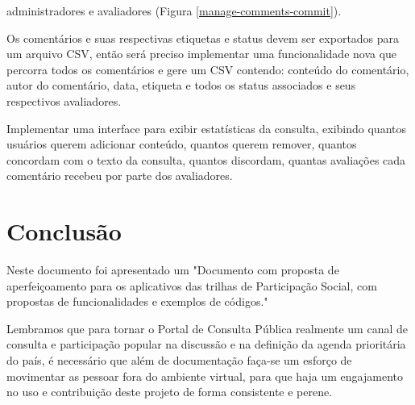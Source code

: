 \documentclass[12pt]{article}
\newcommand{\ProductDescription}{"Documento com proposta de aperfeiçoamento
  para os aplicativos das trilhas de Participação Social, com propostas de
  funcionalidades e exemplos de códigos."
}
\begin{document}
\begin{description}
{    administradores e avaliadores (Figura \ref{manage-comments-commit}).}
  \item[Exportar dados associados aos comentários em formato CSV]{Os
    comentários e suas respectivas etiquetas e status devem ser exportados
    para um arquivo CSV, então será preciso implementar uma funcionalidade nova
    que percorra todos os comentários e gere um CSV contendo: conteúdo do
    comentário, autor do comentário, data, etiqueta e todos os status associados e
    seus respectivos avaliadores.}
  \item[Interface de exibição de estatísticas de contribuições]{Implementar
    uma interface para exibir estatísticas da consulta, exibindo quantos
    usuários querem adicionar conteúdo, quantos querem remover, quantos
    concordam com o texto da consulta, quantos discordam, quantas avaliações
    cada comentário recebeu por parte dos avaliadores.}
\end{description}

\section{Conclusão}

Neste documento foi apresentado um \ProductDescription

Lembramos que para tornar o Portal de Consulta Pública realmente um canal de
consulta e participação popular na discussão e na definição da agenda
prioritária do país, é necessário que além de documentação faça-se um esforço
de movimentar as pessoar fora do ambiente virtual, para que haja um
engajamento no uso e contribuição deste projeto de forma consistente e perene.

\newpage

\newpage
\listoffigures
\newpage
\printindex
\newpage

\appendix
\appendixpage

\end{document}
